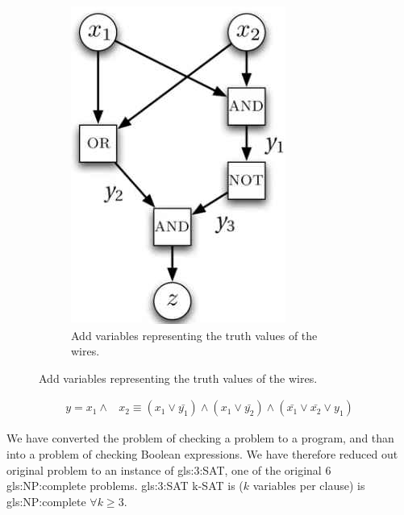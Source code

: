 \documentclass[]{article}
\begin{document}
\begin{figure}[H]
\begin{center}
		\begin{subfigure}[b]{0.45\textwidth}
			\caption{Add variables representing the truth values of the wires.}\label{fig:add:variables}
			\includegraphics[width=\textwidth]{add-variables}
		\end{subfigure}
	\end{center}
\end{figure}

\begin{align*}
	y = x_1 \land& x_2 \equiv (x_1\lor \bar{y_1}) \land (x_1\lor \bar{y_2}) \land (\bar{x_1} \lor \bar{x_2} \lor y_1)
\end{align*}

We have converted the problem of checking a problem to a program, and than into a problem of checking Boolean expressions. We have therefore reduced out original problem to an instance of \gls{gls:3:SAT}, one of the original 6 \gls{gls:NP:complete} problems.
\glsdesc{gls:3:SAT} k-SAT is ($k$ variables per clause) is \gls{gls:NP:complete} $\forall k \ge 3$.
\end{document}
